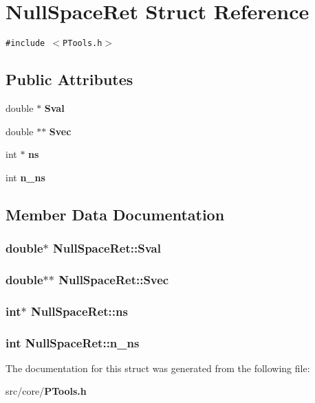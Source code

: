 \section{Null\-Space\-Ret Struct Reference}
\label{structNullSpaceRet}
{\tt \#include $<$PTools.h$>$}

\subsection*{Public Attributes}
\begin{CompactItemize}
\item 
double $\ast$ {\bf Sval}
\item 
double $\ast$$\ast$ {\bf Svec}
\item 
int $\ast$ {\bf ns}
\item 
int {\bf n\_\-ns}
\end{CompactItemize}


\subsection{Member Data Documentation}
\subsubsection{\setlength{\rightskip}{0pt plus 5cm}double$\ast$ {\bf Null\-Space\-Ret::Sval}}\label{structNullSpaceRet_3ac3b95696e7bfbde025b96626d294f1}


\subsubsection{\setlength{\rightskip}{0pt plus 5cm}double$\ast$$\ast$ {\bf Null\-Space\-Ret::Svec}}\label{structNullSpaceRet_f3a906d7ca6e0bd780711802b6c8a97b}


\subsubsection{\setlength{\rightskip}{0pt plus 5cm}int$\ast$ {\bf Null\-Space\-Ret::ns}}\label{structNullSpaceRet_44992d6857bdd5b4781a10f41a48e870}


\subsubsection{\setlength{\rightskip}{0pt plus 5cm}int {\bf Null\-Space\-Ret::n\_\-ns}}\label{structNullSpaceRet_f5a87e9340798b78d85f7f5a3b4703f4}




The documentation for this struct was generated from the following file:\begin{CompactItemize}
\item 
src/core/{\bf PTools.h}\end{CompactItemize}
